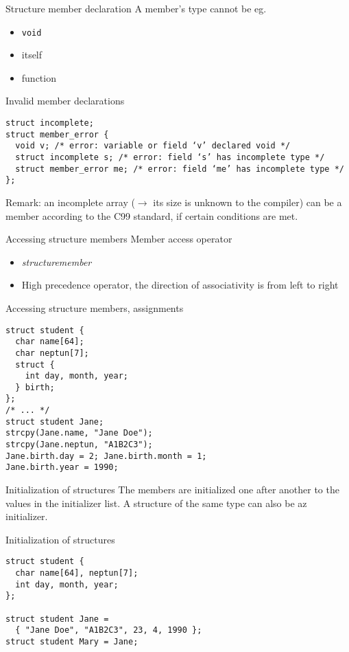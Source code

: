 \documentclass[usenames,dvipsnames,aspectratio=169]{beamer}
\begin{document}
\begin{frame}[fragile]{Structure member declaration}
  A member's type cannot be eg.
  \begin{itemize}
    \item \texttt{void}
    \item itself
    \item function
  \end{itemize}
  \scriptsize
  \begin{alertblock}{Invalid member declarations}
    \begin{verbatim}
struct incomplete;
struct member_error {
  void v; /* error: variable or field ‘v’ declared void */
  struct incomplete s; /* error: field ‘s’ has incomplete type */
  struct member_error me; /* error: field ‘me’ has incomplete type */
};
\end{verbatim}
  \end{alertblock}
  \tiny
  Remark: an incomplete array ($\to$ its size is unknown to the compiler) can be a member according to the C99 standard, if certain conditions are met.
\end{frame}

\begin{frame}[fragile]{Accessing structure members}
  Member access operator
  \begin{itemize}
    \item \emph{structuremember}
    \item High precedence operator, the direction of associativity is from left to right
  \end{itemize}
  \footnotesize
  \begin{exampleblock}{Accessing structure members, assignments}
    \begin{verbatim}
struct student {
  char name[64];
  char neptun[7];
  struct {
    int day, month, year;
  } birth;
};
/* ... */
struct student Jane;
strcpy(Jane.name, "Jane Doe");
strcpy(Jane.neptun, "A1B2C3");
Jane.birth.day = 2; Jane.birth.month = 1; 
Jane.birth.year = 1990;
\end{verbatim}
  \end{exampleblock}
\end{frame}

\begin{frame}[fragile]{Initialization of structures}
  The members are initialized one after another to the values in the initializer list.
  A structure of the same type can also be az initializer.
  \begin{exampleblock}{Initialization of structures}
    \begin{verbatim}
struct student {
  char name[64], neptun[7];
  int day, month, year;
};

struct student Jane = 
  { "Jane Doe", "A1B2C3", 23, 4, 1990 };
struct student Mary = Jane;
\end{verbatim}
  \end{exampleblock}
\end{frame}
\end{document}
